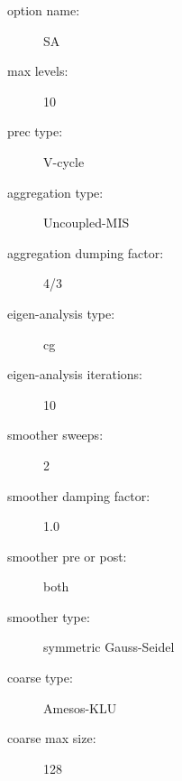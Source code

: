 \begin{description}
\item [option name:] SA
\item [max levels:] 10
\item [prec type:] V-cycle
\item [aggregation type:] Uncoupled-MIS
\item [aggregation dumping factor:] 4/3
\item [eigen-analysis type:] cg
\item [eigen-analysis iterations:] 10
\item [smoother sweeps:] 2
\item [smoother damping factor:] 1.0
\item [smoother pre or post:] both
\item [smoother type:] symmetric Gauss-Seidel
\item [coarse type:] Amesos-KLU
\item [coarse max size:] 128
\end{description}
